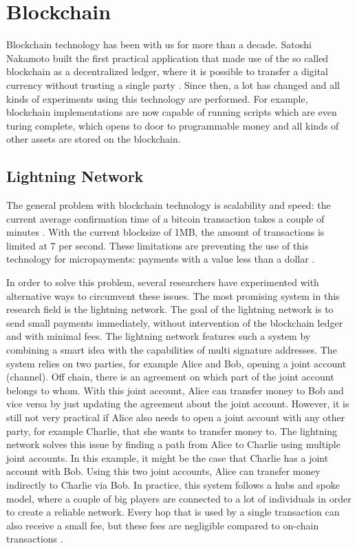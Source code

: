 \section{Blockchain}

Blockchain technology has been with us for more than a decade. Satoshi Nakamoto built the first practical application that made use of the so called blockchain as a decentralized ledger, where it is possible to transfer a digital currency without trusting a single party \cite{nakamoto2019bitcoin}. Since then, a lot has changed and all kinds of experiments using this technology are performed. For example, blockchain implementations are now capable of running scripts which are even turing complete, which opens to door to programmable money \cite{wood2014ethereum} and all kinds of other assets are stored on the blockchain. 


\subsection{Lightning Network}
The general problem with blockchain technology is scalability and speed: the current average confirmation time of a bitcoin transaction takes a couple of minutes \cite{bamert2013have}. With the current blocksize of 1MB, the amount of transactions is limited at 7 per second. These limitations are preventing the use of this technology for micropayments: payments with a value less than a dollar \cite{definitionmicropayment}.

In order to solve this problem, several researchers have experimented with alternative ways to circumvent these issues. The most promising system in this research field is the lightning network. The goal of the lightning network is to send small payments immediately, without intervention of the blockchain ledger and with minimal fees. The lightning network features such a system by combining a smart idea with the capabilities of multi signature addresses. The system relies on two parties, for example Alice and Bob, opening a joint account (channel). Off chain, there is an agreement on which part of the joint account belongs to whom. With this joint account, Alice can transfer money to Bob and vice versa by just updating the agreement about the joint account. However, it is still not very practical if Alice also needs to open a joint account with any other party, for example Charlie, that she wants to transfer money to. The lightning network solves this issue by finding a path from Alice to Charlie using multiple joint accounts. In this example, it might be the case that Charlie has a joint account with Bob. Using this two joint accounts, Alice can transfer money indirectly to Charlie via Bob. In practice, this system follows a hubs and spoke model, where a couple of big players are connected to a lot of individuals in order to create a reliable network. Every hop that is used by a single transaction can also receive a small fee, but these fees are negligible compared to on-chain transactions \cite{poon2016bitcoin}.



